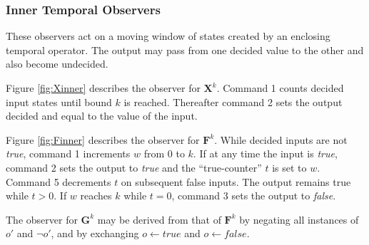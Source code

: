 \documentclass{llncs}
\begin{document}
\subsubsection*{Inner Temporal Observers}

These observers act on a moving window of states created by an enclosing
temporal operator. The output may pass from one decided value to the
other and also become undecided.

Figure \ref{fig:Xinner} describes the observer for $\mathbf{X}^{k}$.
Command 1 counts decided input states until bound $k$ is reached.
Thereafter command 2 sets the output decided and equal to the value
of the input.

Figure \ref{fig:Finner} describes the observer for $\mathbf{F}^{k}$.
While decided inputs are not \emph{true}, command 1 increments $w$
from 0 to $k$. If at any time the input is \emph{true}, command 2
sets the output to \emph{true} and the ``true-counter'' $t$ is
set to $w$. Command 5 decrements $t$ on subsequent false inputs.
The output remains true while $t>0$. If $w$ reaches $k$ while $t=0$,
command 3 sets the output to \emph{false}.

The observer for $\mathbf{G}^{k}$ may be derived from that of $\mathbf{F}^{k}$
by negating all instances of $o'$ and $\neg o'$, and by exchanging
$o\leftarrow\mathit{true}$ and $o\leftarrow\mathit{false}$.
\end{document}
